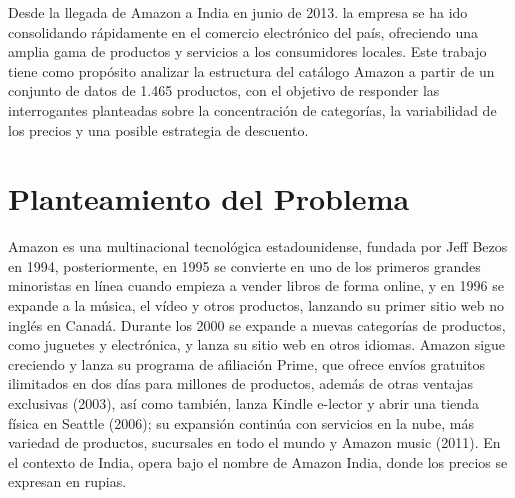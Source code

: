 \documentclass[oneside,11pt]{Latex/Classes/PhDthesisPSnPDF}
\begin{document}
Desde la llegada de Amazon a India en junio de 2013. la empresa se ha
ido consolidando rápidamente en el comercio electrónico del país,
ofreciendo una amplia gama de productos y servicios a los consumidores
locales. Este trabajo tiene como propósito analizar la estructura del
catálogo Amazon a partir de un conjunto de datos de 1.465 productos, con
el objetivo de responder las interrogantes planteadas sobre la
concentración de categorías, la variabilidad de los precios y una
posible estrategia de descuento.

\chapter{Planteamiento del Problema}

Amazon es una multinacional tecnológica estadounidense, fundada por Jeff
Bezos en 1994, posteriormente, en 1995 se convierte en uno de los
primeros grandes minoristas en línea cuando empieza a vender libros de
forma online, y en 1996 se expande a la música, el vídeo y otros
productos, lanzando su primer sitio web no inglés en Canadá. Durante los
2000 se expande a nuevas categorías de productos, como juguetes y
electrónica, y lanza su sitio web en otros idiomas. Amazon sigue
creciendo y lanza su programa de afiliación Prime, que ofrece envíos
gratuitos ilimitados en dos días para millones de productos, además de
otras ventajas exclusivas (2003), así como también, lanza Kindle
e-lector y abrir una tienda física en Seattle (2006); su expansión
continúa con servicios en la nube, más variedad de productos, sucursales
en todo el mundo y Amazon music (2011). En el contexto de India, opera
bajo el nombre de Amazon India, donde los precios se expresan en rupias.
\end{document}
